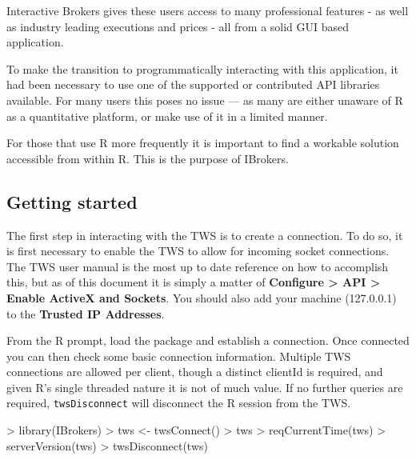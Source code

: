 \documentclass{article}
\begin{document}
Interactive Brokers gives these users access to many
professional features - as well as industry leading
executions and prices - all from a solid GUI
based application.

To make the transition to programmatically interacting
with this application, it had been necessary to use
one of the supported or contributed API libraries
available. For many users this poses no issue --- as many
are either unaware of R as a quantitative platform, or
make use of it in a limited manner.

For those that use R more frequently it is important
to find a workable solution accessible from within
R.  This is the purpose of IBrokers.

\subsection{Getting started}
The first step in interacting with the TWS is to
create a connection.  To do so, it is first
necessary to enable the TWS to allow for
incoming socket connections. The TWS
user manual is the most up to date reference on
how to accomplish this, but as of this document
it is simply a matter of \textbf{Configure > API > Enable ActiveX and Sockets}.
You should also add your machine (127.0.0.1) to the \textbf{Trusted IP Addresses}.

From the R prompt, load the package and establish a
connection. Once connected you can then check some basic connection information.
Multiple TWS connections are allowed per client, though a distinct
clientId is required, and given R's single threaded nature it is not
of much value.
If no further queries are required, {\tt twsDisconnect} will disconnect
the R session from the TWS.
\begin{Schunk}
\begin{Sinput}
> library(IBrokers)
> tws <- twsConnect()
> tws
> reqCurrentTime(tws)
> serverVersion(tws)
> twsDisconnect(tws)
\end{Sinput}
\end{Schunk}
\end{document}
